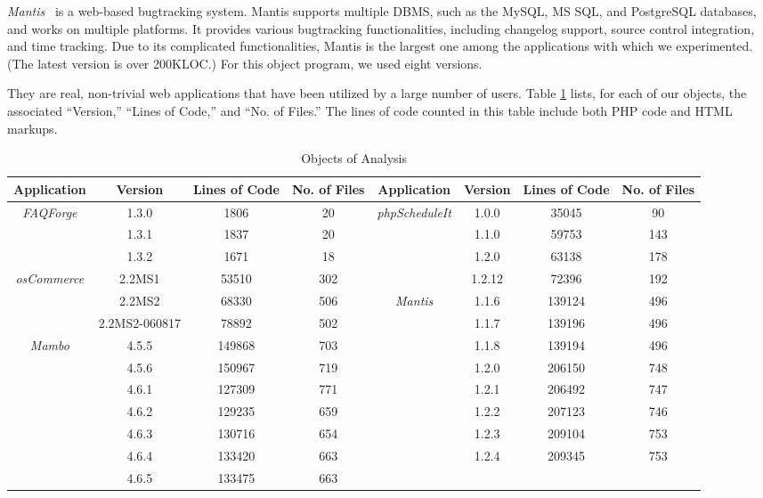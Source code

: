 {\em Mantis}~\cite{mantis} is a web-based bugtracking system. Mantis 
supports multiple
DBMS, such as  the MySQL, MS SQL, and PostgreSQL databases, and works
on multiple platforms. It provides various bugtracking functionalities,
including changelog support, source control integration, and time tracking.
Due to its complicated functionalities, Mantis is the largest one among
the applications with which we experimented. (The latest version is over 200KLOC.)
For this object program, we used eight versions.

They are real, non-trivial web applications that 
have been utilized by a large number of users.
Table \ref{tab:objects} lists, for each of our objects,
the associated ``Version,'' ``Lines of Code,''
and ``No. of Files.''
The lines of code counted in this table include both PHP code and
HTML markups.

\begin{table}[ht]
\caption{Objects of Analysis}
{\small
\begin{center}
\begin{tabular}{|c|c|c|c||c|c|c|c|}
\hline
Application & Version & Lines of Code & No. of Files
&Application & Version & Lines of Code & No. of Files \\
\hline\hline
{\em FAQForge} & 1.3.0 & 1806 & 20 & 
{\em phpScheduleIt} & 1.0.0 & 35045 & 90  \\ \hline
& 1.3.1 & 1837 & 20 & 
& 1.1.0 & 59753 & 143 \\ \hline
& 1.3.2 & 1671 & 18 & 
& 1.2.0 & 63138 & 178 \\ \hline
{\em osCommerce} & 2.2MS1& 53510 & 302 &
& 1.2.12 & 72396 & 192 \\ \hline
& 2.2MS2& 68330 & 506 & 
{\em Mantis} & 1.1.6 & 139124 & 496 \\ \hline
& 2.2MS2-060817& 78892 &  502 & 
& 1.1.7 & 139196 & 496 \\ \hline
{\em Mambo} & 4.5.5 & 149868 & 703 &
& 1.1.8 & 139194 & 496 \\ \hline
& 4.5.6 & 150967 & 719 &
& 1.2.0 & 206150 & 748 \\ \hline
& 4.6.1 & 127309 & 771 &
& 1.2.1 & 206492 & 747 \\ \hline
& 4.6.2 & 129235 & 659 &
& 1.2.2 & 207123 & 746 \\ \hline
& 4.6.3 & 130716 & 654 &
& 1.2.3 & 209104 & 753 \\ \hline
& 4.6.4 & 133420 & 663 &
& 1.2.4 & 209345 & 753 \\ \hline
& 4.6.5 & 133475 & 663 & \multicolumn{4}{|c|}{} \\\hline
\end{tabular}
\end{center}
\label{tab:objects}
}
\end{table}

